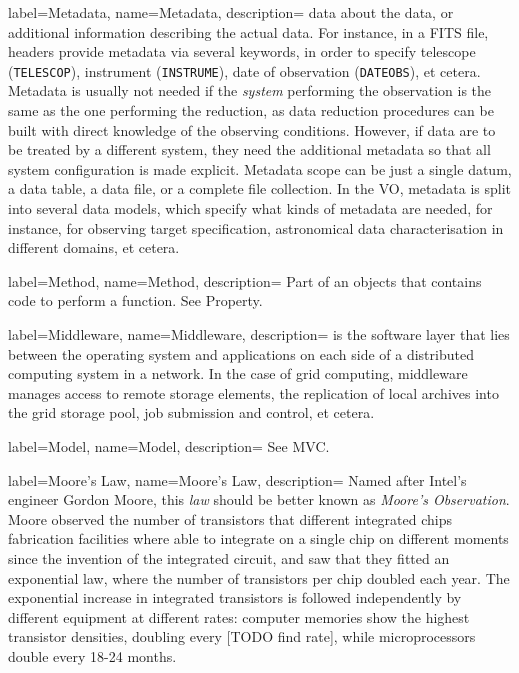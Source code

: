 {
    label={Metadata},
    name={Metadata},
    description={
    	data about the data, or additional information describing the
        actual data. For instance, in a \gls{FITS} file, headers
        provide metadata via several keywords, in order to specify
        telescope (\texttt{TELESCOP}), instrument (\texttt{INSTRUME}),
        date of observation (\texttt{DATEOBS}), et cetera. Metadata is
        usually not needed if the \emph{system} performing the
        observation is the same as the one performing the reduction, as
        data \gls{reduction} procedures can be built with direct
        knowledge of the observing conditions. However, if data are to
        be treated by a different system, they need the additional
        metadata so that all system configuration is made explicit.
        Metadata scope can be just a single datum, a data table, a data
        file, or a complete file collection. In the \gls{VO}, metadata
        is split into several data models, which specify what kinds of
        metadata are needed, for instance, for observing target
        specification, astronomical data characterisation in different
        domains, et cetera.
    }
}

{
    label={Method},
    name={Method},
    description={
    	Part of an objects that contains code to perform a function.
        See \gls{Property}.
    }
}

{
    label={Middleware},
    name={Middleware},
    description={
    	is the software layer that lies between the operating system
        and applications on each side of a distributed computing system
        in a network. In the case of \gls{grid computing}, middleware
        manages access to remote storage elements, the replication of
        local archives into the grid storage pool, job submission and
        control, et cetera.
    }
}

{
    label={Model},
    name={Model},
    description={
    	See \gls{MVC}.
    }
}

{
    label={Moore's Law},
    name={Moore's Law},
    description={
    	Named after Intel's engineer Gordon Moore, this \emph{law}
        should be better known as \emph{Moore's Observation}. Moore
        observed the number of transistors that different integrated
        chips fabrication facilities where able to integrate on a
        single chip on different moments since the invention of the
        integrated circuit, and saw that they fitted an exponential
        law, where the number of transistors per chip doubled each
        year. The exponential increase in integrated transistors is
        followed independently by different equipment at different
        rates: computer memories show the highest transistor densities,
        doubling every [TODO find rate], while microprocessors double
        every 18-24 months.
    }
}

